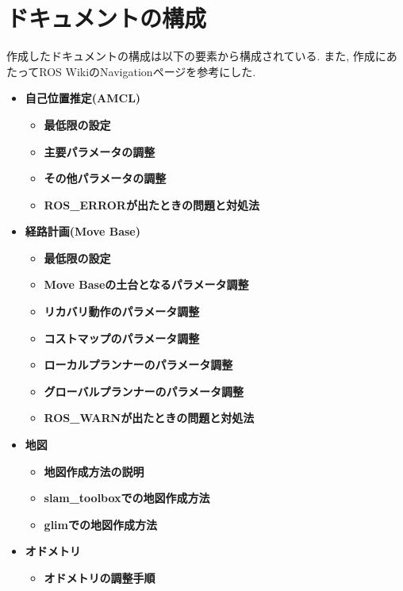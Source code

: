 \section{ドキュメントの構成}
作成したドキュメントの構成は以下の要素から構成されている. 
また, 作成にあたってROS WikiのNavigationページを参考にした.
\cite{ros_wiki_navigation}
\begin{itemize}
     \item \textbf{自己位置推定(AMCL)}
     \begin{itemize}
        \item \textbf{最低限の設定}
        \item \textbf{主要パラメータの調整}
        \item \textbf{その他パラメータの調整}
        \item \textbf{ROS\_ERRORが出たときの問題と対処法}
    \end{itemize}
     \item \textbf{経路計画(Move Base)}
    \begin{itemize}
        \item \textbf{最低限の設定}
        \item \textbf{Move Baseの土台となるパラメータ調整}
        \item \textbf{リカバリ動作のパラメータ調整}
        \item \textbf{コストマップのパラメータ調整}
        \item \textbf{ローカルプランナーのパラメータ調整}
        \item \textbf{グローバルプランナーのパラメータ調整}
        \item \textbf{ROS\_WARNが出たときの問題と対処法}
    \end{itemize}
\newpage
     \item \textbf{地図}
    \begin{itemize}
        \item \textbf{地図作成方法の説明}
        \item \textbf{slam\_toolboxでの地図作成方法}
        \item \textbf{glimでの地図作成方法}
    \end{itemize}
    \item \textbf{オドメトリ}
    \begin{itemize}
        \item \textbf{オドメトリの調整手順}
    \end{itemize}     
\end{itemize}

